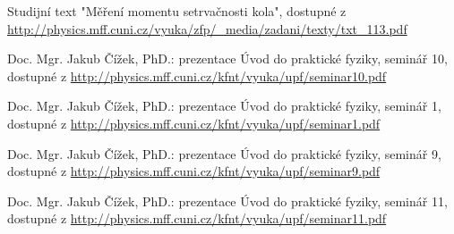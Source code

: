 \documentclass[protokol.tex]{subfiles}
\begin{document}
\begin{thebibliography}{}

Studijní text "Měření momentu setrvačnosti kola", dostupné z\\ \url{http://physics.mff.cuni.cz/vyuka/zfp/_media/zadani/texty/txt_113.pdf}

Doc. Mgr. Jakub Čížek, PhD.: prezentace Úvod do praktické fyziky, seminář 10, dostupné z \url{http://physics.mff.cuni.cz/kfnt/vyuka/upf/seminar10.pdf}

Doc. Mgr. Jakub Čížek, PhD.: prezentace Úvod do praktické fyziky, seminář 1, dostupné z \url{http://physics.mff.cuni.cz/kfnt/vyuka/upf/seminar1.pdf}

Doc. Mgr. Jakub Čížek, PhD.: prezentace Úvod do praktické fyziky, seminář 9, dostupné z \url{http://physics.mff.cuni.cz/kfnt/vyuka/upf/seminar9.pdf}

Doc. Mgr. Jakub Čížek, PhD.: prezentace Úvod do praktické fyziky, seminář 11, dostupné z \url{http://physics.mff.cuni.cz/kfnt/vyuka/upf/seminar11.pdf}

\end{thebibliography}
\end{document}

